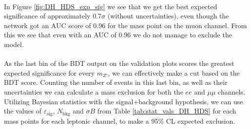 \documentclass[12pt, a4paper]{book}
\begin{document}
\\In Figure \ref{fig:DH_HDS_exp_sig} we see that we get the best expected significance of approximately 0.7$\sigma$ (without uncertainties), even though the network got an AUC score of 0.96 for the mass point on the muon channel. From this we see that even with an AUC of 0.96 we do not manage to exclude the model.\\
\\As the last bin of the BDT output on the validation plots scores the greatest expected significance for every $m_{Z'}$, we can effectively make a cut based on the BDT score. Counting the number of events in this last bin, as well as their uncertainties we can calculate a mass exclusion for both the $ee$ and $\mu\mu$ channels. 
Utilizing Bayesian statistics with the signal+background hypothesis, we can use the values of $\varepsilon_{\text{sig}}$, $N_{\text{bkg}}$ and $\sigma B$ from Table \ref{tab:stat_vals_DH_HDS} for each mass points for each leptonic channel, to make a 95\% CL expected exclusion. \\
\end{document}
